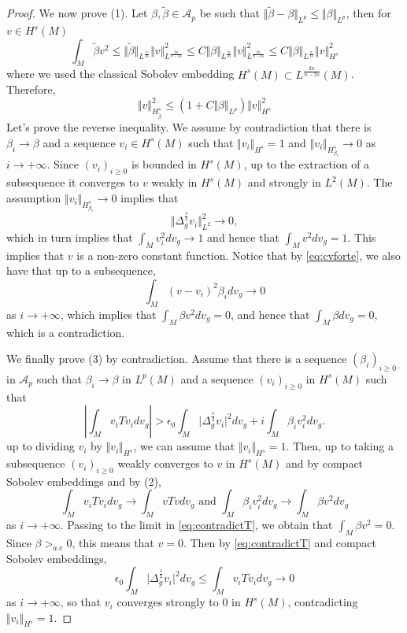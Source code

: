 \documentclass[10pt]{amsart}
\numberwithin{equation}{section}
\def\ep{{\varepsilon}}
\def \ep{\epsilon}
\theoremstyle{plain}
\theoremstyle{remark}
\begin{document}
\begin{proof}
We now prove (1). Let $\beta, \tilde{\beta} \in \mathcal{A}_p $ be such that $\Vert\tilde{\beta}-\beta \Vert_{L^{p}} \leq \Vert \beta \Vert_{L^{p}} $, then for $v \in H^s(M)$
$$ \int_{M} \tilde{\beta} v^2 \leq \Vert \tilde{\beta} \Vert_{L^{\frac{n}{2s}}} \Vert v \Vert_{L^{\frac{2n}{n-2s}}}^2 \leq C \Vert \beta \Vert_{L^{\frac{n}{2s}}} \Vert v \Vert_{L^{\frac{2n}{n-2s}}}^2 \leq C \Vert \beta \Vert_{L^{\frac{n}{2s}}} \Vert v \Vert_{H^{s}}^2 $$
where we used the classical Sobolev embedding $H^s(M) \subset L^{\frac{2n}{n-2s}}(M) $. Therefore, 
$$ \Vert v \Vert_{H^s_{\tilde{\beta}}}^2 \leq \left( 1+ C\Vert \beta \Vert_{L^{p}}\right) \Vert v \Vert_{H^{s}}^2 $$
Let's prove the reverse inequality. We assume by contradiction that there is $\beta_i \to \beta$ and a sequence $v_i \in H^s(M)$ such that $\Vert v_i \Vert_{H^s} = 1 $ and $\Vert v_i \Vert_{H^s_{\beta_i}} \to 0 $ as $i\to +\infty$. Since $(v_i)_{i\geq 0}$ is bounded in $H^s(M)$, up to the extraction of a subsequence it converges to $v$ weakly in $H^s(M)$ and strongly in $L^2(M)$. The assumption $\Vert v_i \Vert_{H^s_{\beta_i}} \to 0 $  implies that 
$$ \Vert \Delta_g^{\frac{s}{2}} v_i \Vert_{L^2}^2 \to 0, $$
which in turn implies that $\int_M v_i ^2 dv_g \to 1$ and hence that $\int_{M} v^2 dv_g = 1$. This implies that $v$ is a non-zero constant function. Notice that by \eqref{eq:cvforte}, we also have that up to a subsequence,
$$ \int_M (v-v_i)^2 \beta_i dv_g \to 0 $$
as $i\to +\infty$, which implies that $\int_M \beta v^2 dv_g = 0$, and hence that $\int_M \beta dv_g = 0$, which is a contradiction. 

\medskip

We finally prove (3) by contradiction. Assume that there is a sequence $(\beta_i)_{i\geq 0}$ in $\mathcal{A}_p$ such that $\beta_i \to \beta$ in $L^p(M)$ and a sequence $(v_i)_{i\geq 0}$ in $H^s(M)$ such that
\begin{equation} \label{eq:contradictT}\left\vert \int_{M} v_iTv_i dv_g \right\vert > \ep_0 \int_M \big|\Delta_g^{\frac{s}{2}} v_i \big|^2 dv_g + i \int_M \beta_i v_i^2 dv_g. \end{equation}
up to dividing $v_i$ by $\Vert v_i \Vert_{H^s}$, we can assume that $\Vert v_i \Vert_{H^s} = 1$. Then, up to taking a subsequence $(v_i)_{i\geq 0}$ weakly converges to $v$ in $H^s(M)$ and by compact Sobolev embeddings and by (2),
$$ \int_M v_i T v_i dv_g \to \int_M v T v dv_g \text{ and } \int_M \beta_i v_i^2 dv_g \to  \int_M \beta v^2 dv_g $$
as $i \to +\infty$. Passing to the limit in \eqref{eq:contradictT}, we obtain that  $ \int_M \beta v^2 = 0$.  Since $\beta>_{a.e}0$, this means that $v = 0$. Then by \eqref{eq:contradictT} and compact Sobolev embeddings,
$$ \ep_0 \int_M \big|\Delta_g^{\frac{s}{2}} v_i \big|^2 dv_g \leq  \int_M v_i T v_i dv_g \to 0  $$
as $i\to +\infty$, so that $v_i$ converges strongly to $0$ in $H^s(M)$, contradicting $\Vert v_i \Vert_{H^s} = 1$.
\end{proof}
\end{document}
